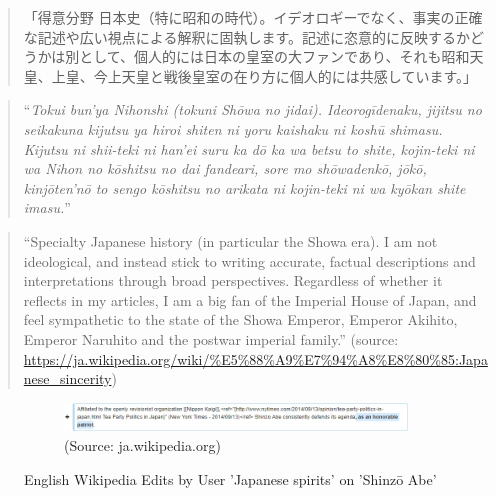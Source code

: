 \documentclass[10pt,british,A4paper,twoside]{memoir}
\begin{document}
\begin{quote}
「得意分野\newline
日本史（特に昭和の時代）。イデオロギーでなく、事実の正確な記述や広い視点による解釈に固執します。記述に恣意的に反映するかどうかは別として、個人的には日本の皇室の大ファンであり、それも昭和天皇、上皇、今上天皇と戦後皇室の在り方に個人的には共感しています。」
\end{quote}

\begin{quote}
``\emph{Tokui bun'ya\newline
Nihonshi (tokuni Shōwa no jidai). Ideorogīdenaku, jijitsu no seikakuna
kijutsu ya hiroi shiten ni yoru kaishaku ni koshū shimasu. Kijutsu ni
shii-teki ni han'ei suru ka dō ka wa betsu to shite, kojin-teki ni wa
Nihon no kōshitsu no dai fandeari, sore mo shōwadenkō, jōkō, kinjōten'nō
to sengo kōshitsu no arikata ni kojin-teki ni wa kyōkan shite imasu.}''
\end{quote}

\begin{quote}
``Specialty\newline
Japanese history (in particular the Showa era). I am not ideological,
and instead stick to writing accurate, factual descriptions and
interpretations through broad perspectives. Regardless of whether it
reflects in my articles, I am a big fan of the Imperial House of Japan,
and feel sympathetic to the state of the Showa Emperor, Emperor Akihito,
Emperor Naruhito and the postwar imperial family.'' (source:
\url{https://ja.wikipedia.org/wiki/\%E5\%88\%A9\%E7\%94\%A8\%E8\%80\%85:Japanese_sincerity})
\end{quote}

\begin{figure}[!htb]
 \centering
 \begin{subfigure}[b]{1\textwidth}
 \includegraphics[width=.9\textwidth]{images/wiki/japanese-spirits-abe.jpg}
 \caption*{(Source: ja.wikipedia.org)}
 \end{subfigure}
 \caption{English Wikipedia Edits by User 'Japanese spirits' on 'Shinzō Abe'}\label{fig:js-abe}
\end{figure}
\end{document}
